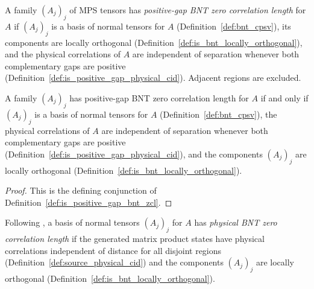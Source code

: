 \begin{definition}%
    \label{def:is_positive_gap_bnt_zcl}
    \leanok
    A family $(A_j)_j$ of MPS tensors has \emph{positive-gap BNT zero correlation
        length} for $A$ if $(A_j)_j$ is a basis of normal tensors for $A$
    (Definition~\ref{def:bnt_cpsv}), its components are locally orthogonal
    (Definition~\ref{def:is_bnt_locally_orthogonal}), and the physical
    correlations of $A$ are independent of separation whenever both complementary
    gaps are positive (Definition~\ref{def:is_positive_gap_physical_cid}).
    Adjacent regions are excluded.
\end{definition}

\begin{lemma}%
    \label{lem:is_positive_gap_bnt_zcl_iff}
    \leanok
    A family $(A_j)_j$ has positive-gap BNT zero correlation length for $A$ if
    and only if $(A_j)_j$ is a basis of normal tensors for $A$
    (Definition~\ref{def:bnt_cpsv}), the physical correlations of $A$ are
    independent of separation whenever both complementary gaps are positive
    (Definition~\ref{def:is_positive_gap_physical_cid}), and the components
    $(A_j)_j$ are locally orthogonal
    (Definition~\ref{def:is_bnt_locally_orthogonal}).
\end{lemma}
\begin{proof}\leanok
    This is the defining conjunction of Definition~\ref{def:is_positive_gap_bnt_zcl}.
\end{proof}

\begin{definition}%
    \label{def:source_bnt_zcl}
    \leanok
    Following \cite[Definition~3.6]{Cirac2016MPDO_arXiv}, a basis of normal
    tensors $(A_j)_j$ for $A$ has \emph{physical BNT zero correlation length}
    if the generated matrix product states have physical correlations
    independent of distance for all disjoint regions
    (Definition~\ref{def:source_physical_cid}) and the components $(A_j)_j$ are
    locally orthogonal (Definition~\ref{def:is_bnt_locally_orthogonal}).
\end{definition}

